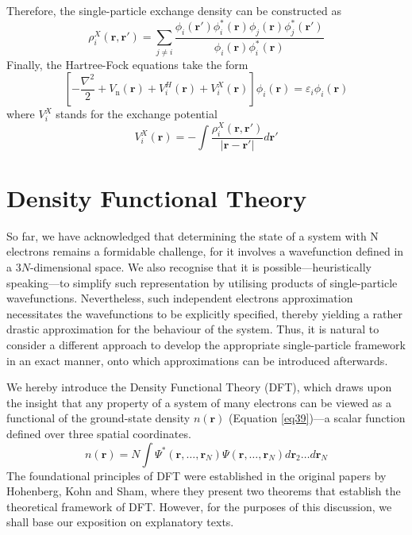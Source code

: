 Therefore, the single-particle exchange density can be constructed as 
\begin{equation}
  \label{eq36}
  \rho^X_i(\mathbf{r}, \mathbf{r'}) = \sum_{j\neq i}\frac{\phi_i(\mathbf{r'})\phi^*_i(\mathbf{r})\phi_j(\mathbf{r})\phi^*_j(\mathbf{r'})}{\phi_i(\mathbf{r})\phi^*_i(\mathbf{r})}
\end{equation}
Finally, the Hartree-Fock equations take the form 
\begin{equation}
  \label{eq37}
  \left[-\frac{\nabla^2}{2} + V_{\text{n}}(\mathbf{r}) + V^H_i(\mathbf{r}) + V^X_i(\mathbf{r})\right]\phi_i(\mathbf{r}) = \varepsilon_i \phi_i(\mathbf{r})
\end{equation}
where $V^X_i$ stands for the exchange potential
\begin{equation}
  \label{eq38}
  V^X_i(\mathbf{r}) = -\int \frac{\rho^X_i(\mathbf{r}, \mathbf{r'})}{|\mathbf{r} - \mathbf{r'}|} d\mathbf{r'}
\end{equation}

\section{Density Functional Theory}
So far, we have acknowledged that determining the state of a system with N electrons remains a formidable challenge, for it involves a wavefunction defined in a $3N$-dimensional space. We also recognise that it is possible---heuristically speaking---to simplify such representation by utilising products of single-particle wavefunctions. Nevertheless, such independent electrons approximation necessitates the wavefunctions to be explicitly specified, thereby yielding a rather drastic approximation for the behaviour of the system. Thus, it is natural to consider a different approach to develop the appropriate single-particle framework in an exact manner, onto which approximations can be introduced afterwards.

We hereby introduce the Density Functional Theory (DFT), which draws upon the insight that any property of a system of many electrons can be viewed as a functional of the ground-state density $n(\mathbf{r})$\supercite{martin2020electronic} (Equation \ref{eq39})---a scalar function defined over three spatial coordinates. 
\begin{equation}
  n(\mathbf{r}) = N \int \Psi^*(\mathbf{r}, \ldots, \mathbf{r}_N) \Psi(\mathbf{r},\ldots, \mathbf{r}_N) d\mathbf{r}_2 \ldots d\mathbf{r}_N
  \label{eq39}
\end{equation}
The foundational principles of DFT were established in the original papers by Hohenberg, Kohn and Sham\supercite{Hohenberg1964, Kohn1965}, where they present two theorems that establish the theoretical framework of DFT.
However, for the purposes of this discussion, we shall base our exposition on explanatory texts\supercite{martin2020electronic, giustino2014materials, kaxiras2003atomic, sholl2023density}.


